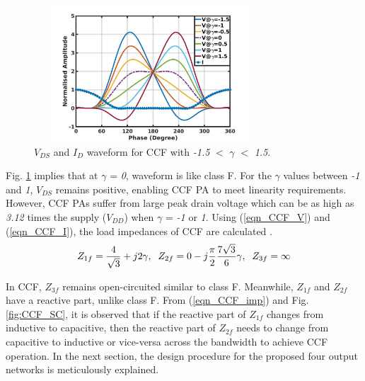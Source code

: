 \documentclass[conference]{IEEEtran}
\begin{document}
\begin{figure}[!t]
\centering
\captionsetup{font=footnotesize}
\includegraphics[width=3.4in, height=2in]{Images/CCF/CCF_wave_VI.jpg}
\caption{$V_{DS}$ and $I_D$ waveform for CCF with \textit{-1.5} $<$ $\gamma$ $<$ \textit{1.5}.}
\label{fig:CCF_wave_VI}
\vspace{-0.25in}
\end{figure}

Fig. \ref{fig:CCF_wave_VI} \color{blue} implies \color{black} that at $\gamma$ = \textit{0}, waveform is like class F. For the $\gamma$ values between \textit{-1} and \textit{1}, $V_{DS}$ remains positive\color{blue}, enabling CCF PA to meet linearity requirements. However, CCF PAs suffer from large peak drain voltage which can be as high as \textit{3.12} times the supply ($V_{DD}$) when $\gamma$ = \textit{-1} or \textit{1}. Using (\ref{eqn_CCF_V}) and (\ref{eqn_CCF_I}), the load impedances of CCF  are calculated \cite{CCFDesign_ali}.\color{black} 
\begin{equation}
\begin{aligned}
Z_{1f}=\frac{4}{\sqrt{3}}+j 2 \gamma, \hspace{2mm}
Z_{2f}=0-j \frac{\pi}{2} \frac{7 \sqrt{3}}{6} \gamma,\hspace{2mm}
Z_{3f}=\infty
\label{eqn_CCF_imp}
\end{aligned}
\end{equation}

In CCF, $Z_{3f}$ remains open-circuited similar to class F. Meanwhile, $Z_{1f}$ and $Z_{2f}$ \color{blue} have \color{black} a reactive part, unlike class F. From  \color{blue} (\ref{eqn_CCF_imp}) \color{black} and Fig. \ref{fig:CCF_SC}, it is observed that if the reactive part of $Z_{1f}$ changes from inductive to capacitive, then the reactive part of $Z_{2f}$ \color{blue}  needs \color{black} to change from capacitive to inductive or vice-versa across the bandwidth to achieve CCF operation. In the next section, the design procedure for the \color{blue}  proposed \color{black}  four output networks is \color{blue} meticulously explained. \color{black} 
\end{document}
